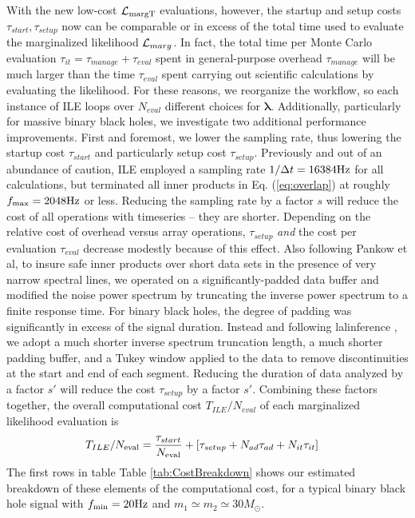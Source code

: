 \documentclass[twocolumn,prd,nofootinbib]{revtex4}
\newcommand\AddedResponse[1]{{\color{blue} {#1}}}
\newcommand\unit[1]{{\rm #1}}
\newcommand\ILE{ILE}
\begin{document}
With the new low-cost ${\cal L}_{\rm margT}$ evaluations, however, the startup and setup costs  $\tau_{start},\tau_{setup}$ now can be
comparable or in excess of the total time used to evaluate the marginalized likelihood ${\cal L}_{marg}$.   In fact, the total time per Monte Carlo
evaluation $\tau_{it}=\tau_{manage}+\tau_{eval}$  spent in general-purpose overhead $\tau_{manage}$ will be much larger than the time $\tau_{eval}$ spent
carrying out scientific calculations by evaluating the likelihood.  For these reasons, we reorganize the workflow, so each
instance of ILE loops over
$N_{eval}$ different choices for $\bm{\lambda}$. 
%
Additionally, particularly for massive binary black holes, we investigate two additional performance improvements.  First and
foremost, we lower the sampling rate, thus lowering the startup cost $\tau_{start}$ and particularly setup cost
$\tau_{setup}$.  Previously and out of an abundance of caution, \ILE{} employed a sampling rate $1/\Delta t = 16384
\unit{Hz}$ for all calculations, but terminated all inner products in Eq. (\ref{eq:overlap}) at roughly $f_{\rm
  max}=2048\unit{Hz}$ or less.   Reducing the sampling rate by a factor $s$ will \AddedResponse{reduce} the  cost of all operations with
timeseries -- they are shorter.  Depending on the relative cost of overhead versus array operations,  $\tau_{setup}$
\emph{and} the cost per evaluation $\tau_{eval}$ decrease modestly because of this effect.  
Also following Pankow et al, to insure safe inner products over short data sets in the presence of very narrow spectral lines, we operated on a
significantly-padded data buffer and modified the noise power spectrum by truncating the inverse power spectrum to a
finite response time.  For binary black holes, the degree of padding was significantly
in excess of the signal duration.  
Instead and following lalinference \cite{gw-astro-PE-lalinference-v1}, we adopt a much shorter inverse spectrum truncation length, a much shorter padding buffer, and
a Tukey window applied to the data to remove discontinuities at the start and end of each segment.   
Reducing the duration of data analyzed by a factor $s'$ will reduce the cost $\tau_{setup}$ by a factor $s'$.  
%
Combining these factors together, the overall computational cost  $T_{ILE}/N_{eval}$  of each marginalized likelihood
evaluation is
\begin{align}
T_{ILE}/N_{\rm eval} &= \frac{\tau_{start}}{N_{\rm eval}} 
 + 
 [ \tau_{setup} + N_{ad} \tau_{ad} + N_{it}\tau_{it}
 ] 
\end{align}
The first rows in table Table  \ref{tab:CostBreakdown} shows our estimated breakdown of these elements of the computational cost, for a typical binary black hole signal with $f_{\rm min}=20 \unit{Hz}$ and $m_1\simeq m_2\simeq 30 M_\odot$.
\end{document}
